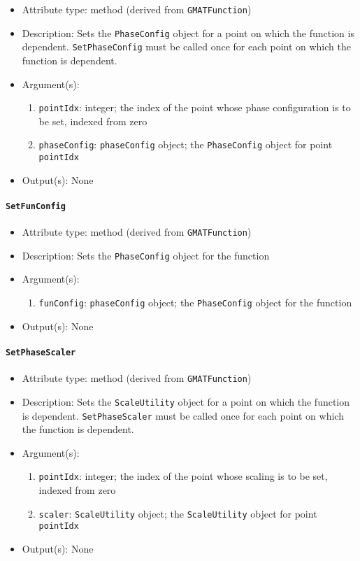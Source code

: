 \documentclass[]{article}
\begin{document}
\begin{itemize}
	\item Attribute type: method (derived from \texttt{GMATFunction})
	\item Description: Sets the \texttt{PhaseConfig} object for a point on which the function is dependent. \texttt{SetPhaseConfig} must be called once for each point on which the function is dependent.
	\item Argument(s):
	\begin{enumerate}
		\item \texttt{pointIdx}: integer; the index of the point whose phase configuration is to be set, indexed from zero
		\item \texttt{phaseConfig}: \texttt{phaseConfig} object; the \texttt{PhaseConfig} object for point \texttt{pointIdx}
	\end{enumerate}
	\item Output(s): None
\end{itemize}

\paragraph{\texttt{SetFunConfig}}

\begin{itemize}
	\item Attribute type: method (derived from \texttt{GMATFunction})
	\item Description: Sets the \texttt{PhaseConfig} object for the function
	\item Argument(s):
	\begin{enumerate}
		\item \texttt{funConfig}: \texttt{phaseConfig} object; the \texttt{PhaseConfig} object for the function
	\end{enumerate}
	\item Output(s): None
\end{itemize}

\paragraph{\texttt{SetPhaseScaler}}

\begin{itemize}
	\item Attribute type: method (derived from \texttt{GMATFunction})
	\item Description: Sets the \texttt{ScaleUtility} object for a point on which the function is dependent. \texttt{SetPhaseScaler} must be called once for each point on which the function is dependent.
	\item Argument(s):
	\begin{enumerate}
		\item \texttt{pointIdx}: integer; the index of the point whose scaling is to be set, indexed from zero
		\item \texttt{scaler}: \texttt{ScaleUtility} object; the \texttt{ScaleUtility} object for point \texttt{pointIdx}
	\end{enumerate}
	\item Output(s): None
\end{itemize}
\end{document}
